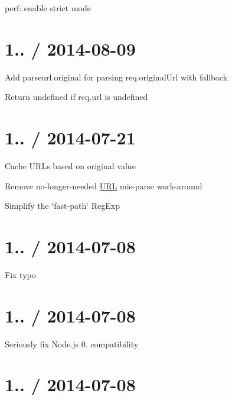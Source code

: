 
\begin{DoxyItemize}
\item perf\+: enable strict mode
\end{DoxyItemize}

\section*{1.. / 2014-\/08-\/09 }


\begin{DoxyItemize}
\item Add {\ttfamily parseurl.\+original} for parsing {\ttfamily req.\+original\+Url} with fallback
\item Return {\ttfamily undefined} if {\ttfamily req.\+url} is {\ttfamily undefined}
\end{DoxyItemize}

\section*{1.. / 2014-\/07-\/21 }


\begin{DoxyItemize}
\item Cache U\+R\+Ls based on original value
\item Remove no-\/longer-\/needed \mbox{\hyperlink{namespace_u_r_l}{U\+RL}} mis-\/parse work-\/around
\item Simplify the \char`\"{}fast-\/path\char`\"{} {\ttfamily Reg\+Exp}
\end{DoxyItemize}

\section*{1.. / 2014-\/07-\/08 }


\begin{DoxyItemize}
\item Fix typo
\end{DoxyItemize}

\section*{1.. / 2014-\/07-\/08 }


\begin{DoxyItemize}
\item Seriously fix Node.\+js 0. compatibility
\end{DoxyItemize}

\section*{1.. / 2014-\/07-\/08 }


